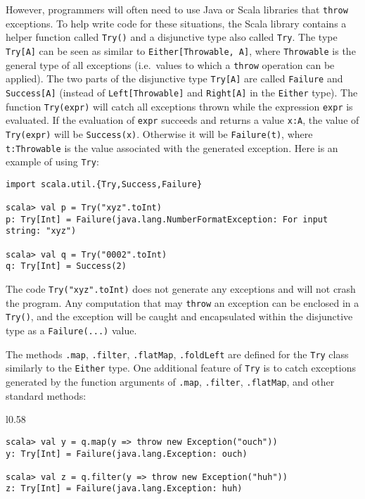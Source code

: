 However, programmers will often need to use Java or Scala libraries
that \lstinline!throw! exceptions. To help write code for these situations,
the Scala library contains a helper function called \lstinline!Try()!
and a disjunctive type also called \lstinline!Try!. The type \lstinline!Try[A]!
can be seen as similar to \lstinline!Either[Throwable, A]!, where
\lstinline!Throwable! is the general type of all exceptions (i.e.~values
to which a \lstinline!throw! operation can be applied). The two parts
of the disjunctive type \lstinline!Try[A]! are called \lstinline!Failure!
and \lstinline!Success[A]! (instead of \lstinline!Left[Throwable]!
and \lstinline!Right[A]! in the \lstinline!Either! type). The function
\lstinline!Try(expr)! will catch all exceptions thrown while the
expression \lstinline!expr! is evaluated. If the evaluation of \lstinline!expr!
succeeds and returns a value \lstinline!x:A!, the value of \lstinline!Try(expr)!
will be \lstinline!Success(x)!. Otherwise it will be \lstinline!Failure(t)!,
where \lstinline!t:Throwable! is the value associated with the generated
exception. Here is an example of using \lstinline!Try!:
\begin{lstlisting}
import scala.util.{Try,Success,Failure}

scala> val p = Try("xyz".toInt)
p: Try[Int] = Failure(java.lang.NumberFormatException: For input string: "xyz")

scala> val q = Try("0002".toInt)
q: Try[Int] = Success(2) 
\end{lstlisting}
The code \lstinline!Try("xyz".toInt)! does not generate any exceptions
and will not crash the program. Any computation that may \lstinline!throw!
an exception can be enclosed in a \lstinline!Try()!, and the exception
will be caught and encapsulated within the disjunctive type as a \lstinline!Failure(...)!
value.

The methods \lstinline!.map!, \lstinline!.filter!, \lstinline!.flatMap!,
\lstinline!.foldLeft! are defined for the \lstinline!Try! class
similarly to the \lstinline!Either! type. One additional feature
of \lstinline!Try! is to catch exceptions generated by the function
arguments of \lstinline!.map!, \lstinline!.filter!, \lstinline!.flatMap!,
and other standard methods:

\begin{wrapfigure}{l}{0.58\columnwidth}%
\vspace{-0.9\baselineskip}

\begin{lstlisting}
scala> val y = q.map(y => throw new Exception("ouch"))
y: Try[Int] = Failure(java.lang.Exception: ouch)

scala> val z = q.filter(y => throw new Exception("huh"))
z: Try[Int] = Failure(java.lang.Exception: huh)
\end{lstlisting}
\vspace{-0.9\baselineskip}
\end{wrapfigure}%

